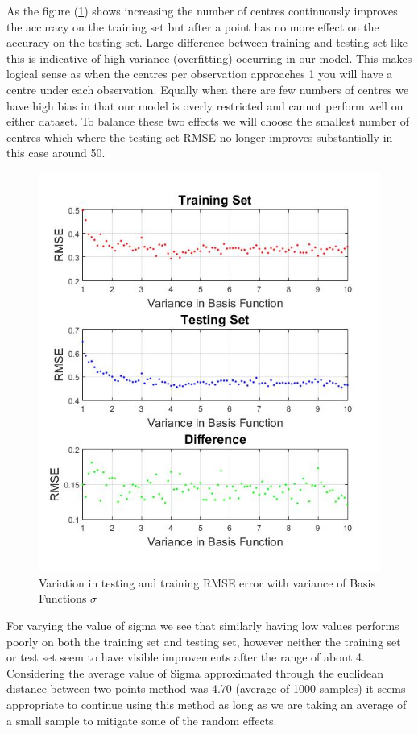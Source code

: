 \documentclass[a4paper,11pt, twocolumn]{article}
\begin{document}
As the figure (\ref{fig:VaryingK}) shows increasing the number of centres continuously improves the accuracy on the training set but after a point has no more effect on the accuracy on the testing set. Large difference between training and testing set like this is indicative of high variance (overfitting) occurring in our model. This makes logical sense as when the centres per observation approaches 1 you will have a centre under each observation. Equally when there are few numbers of centres we have high bias in that our model is overly restricted and cannot perform well on either dataset. To balance these two effects we will choose the smallest number of centres which where the testing set RMSE no longer improves substantially in this case around 50. 

\begin{figure}[ht]
	\includegraphics[width=0.8\linewidth]{VaryingSigma.jpg}
	\centering
	\caption{Variation in testing and training RMSE error with variance of Basis Functions $\sigma$}
		\label{fig:VaryingK}
\end{figure}

For varying the value of sigma we see that similarly having low values performs poorly on both the training set and testing set, however neither the training set or test set seem to have visible improvements after the range of about 4. Considering the average value of Sigma approximated through the euclidean distance between two points method was 4.70 (average of 1000 samples) it seems appropriate to continue using this method as long as we are taking an average of a small sample to mitigate some of the random effects. 
\end{document}
